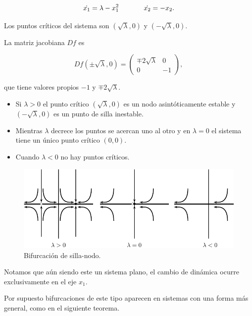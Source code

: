\begin{example}
$$ 
	\dot{x_1} = \lambda - x_1^2 \hspace{0.5in} \dot{x_2} = -x_2.
$$

Los puntos críticos del sistema son $(\sqrt{\lambda}, 0)$ y $(-\sqrt{\lambda}, 0).$

La matriz jacobiana $Df$ es

$$
Df(\pm \sqrt{\lambda}, 0) = \left( \begin{array}{ll}
	\mp 2 \sqrt{\lambda} & 0 \\
	0 & -1
\end{array} \right),
$$

que tiene valores propios $-1$ y $\mp 2\sqrt{\lambda}$.

\begin{itemize}
	\item Si $\lambda > 0$ el punto crítico $(\sqrt{\lambda}, 0)$ es un nodo asintóticamente estable y $(-\sqrt{\lambda}, 0)$ es un punto de silla inestable.
	\item Mientras $\lambda$ decrece los puntos se acercan uno al otro y en $\lambda = 0$ el sistema tiene un único punto crítico $(0,0)$.
	\item Cuando $\lambda < 0$ no hay puntos críticos.
\end{itemize}

\begin{figure}[ht] \centering
    \includegraphics[scale=1.0]{figures/bifurcations-saddlenode.pdf}
    \caption{Bifurcación de silla-nodo.}
\end{figure}

Notamos que aún siendo este un sistema plano, el cambio de dinámica ocurre exclusivamente en el eje $x_1$.
\end{example}

Por supuesto bifurcaciones de este tipo aparecen en sistemas con una forma más general, como en el siguiente teorema.

